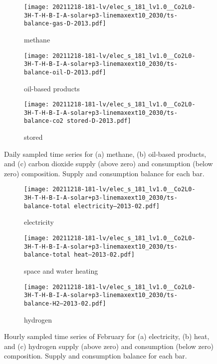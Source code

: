 \begin{figure}
    \centering
    \begin{subfigure}[t]{\textwidth}
        \centering
        \caption{methane}
        \texttt{[image: 20211218-181-lv/elec\_s\_181\_lv1.0\_\_Co2L0-3H-T-H-B-I-A-solar+p3-linemaxext10\_2030/ts-balance-gas-D-2013.pdf]}
    \end{subfigure}
    \begin{subfigure}[t]{\textwidth}
        \centering
        \caption{oil-based products}
        \texttt{[image: 20211218-181-lv/elec\_s\_181\_lv1.0\_\_Co2L0-3H-T-H-B-I-A-solar+p3-linemaxext10\_2030/ts-balance-oil-D-2013.pdf]}
    \end{subfigure}
    \begin{subfigure}[t]{\textwidth}
        \centering
        \caption{stored \co}
        \texttt{[image: 20211218-181-lv/elec\_s\_181\_lv1.0\_\_Co2L0-3H-T-H-B-I-A-solar+p3-linemaxext10\_2030/ts-balance-co2 stored-D-2013.pdf]}
    \end{subfigure}
    \caption{Daily sampled time series for (a) methane, (b) oil-based products, and (c) carbon dioxide supply (above zero) and consumption (below zero) composition. Supply and consumption balance for each bar.}
    \label{fig:output-ts-2}
\end{figure}


\begin{figure}
    \centering
    \begin{subfigure}[t]{\textwidth}
        \centering
        \caption{electricity}
        \texttt{[image: 20211218-181-lv/elec\_s\_181\_lv1.0\_\_Co2L0-3H-T-H-B-I-A-solar+p3-linemaxext10\_2030/ts-balance-total electricity--2013-02.pdf]}
    \end{subfigure}
    \begin{subfigure}[t]{\textwidth}
        \centering
        \caption{space and water heating}
        \texttt{[image: 20211218-181-lv/elec\_s\_181\_lv1.0\_\_Co2L0-3H-T-H-B-I-A-solar+p3-linemaxext10\_2030/ts-balance-total heat--2013-02.pdf]}
    \end{subfigure}
    \begin{subfigure}[t]{\textwidth}
        \centering
        \caption{hydrogen}
        \texttt{[image: 20211218-181-lv/elec\_s\_181\_lv1.0\_\_Co2L0-3H-T-H-B-I-A-solar+p3-linemaxext10\_2030/ts-balance-H2--2013-02.pdf]}
    \end{subfigure}
    \caption{Hourly sampled time series of February for (a) electricity, (b) heat, and (c) hydrogen supply (above zero) and consumption (below zero) composition. Supply and consumption balance for each bar.}
    \label{fig:output-ts-3}
\end{figure}

